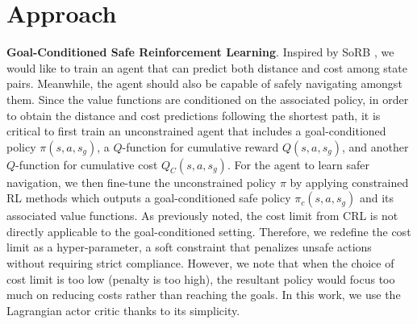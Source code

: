 \documentclass[letterpaper, 10 pt, conference]{IEEEConference}
\begin{document}
\section{Approach}
\label{approach}

\textbf{Goal-Conditioned Safe Reinforcement Learning}. Inspired by SoRB \cite{eysenbach2019search}, we would like to train an agent that can predict both distance and cost among state pairs. Meanwhile, the agent should also be capable of safely navigating amongst them. Since the value functions are conditioned on the associated policy, in order to obtain the distance and cost predictions following the shortest path, it is critical to first train an unconstrained agent that includes a goal-conditioned policy $\pi(s, a, s_g)$, a $Q$-function for cumulative reward $Q(s, a, s_g)$, and another $Q$-function for cumulative cost $Q_C(s, a, s_g)$. For the agent to learn safer navigation, we then fine-tune the unconstrained policy $\pi$ by applying constrained RL methods which outputs a goal-conditioned safe policy $\pi_{c}(s, a, s_g)$ and its associated value functions. As previously noted, the cost limit from CRL is not directly applicable to the goal-conditioned setting. Therefore, we redefine the cost limit as a hyper-parameter, a soft constraint that penalizes unsafe actions without requiring strict compliance. However, we note that when the choice of cost limit is too low (penalty is too high), the resultant policy would focus too much on reducing costs rather than reaching the goals. In this work, we use the Lagrangian actor critic \cite{Ray2019} thanks to its simplicity.
\end{document}
